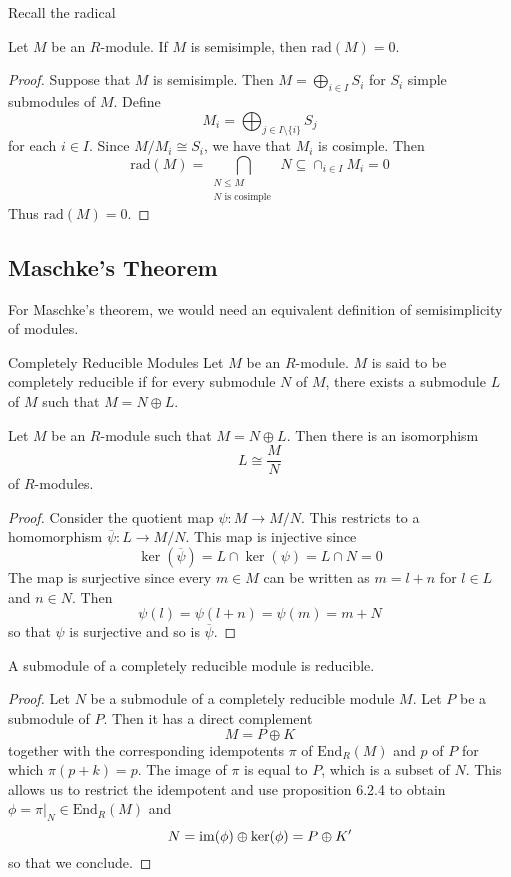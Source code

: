 \documentclass[a4paper]{article}
\begin{document}
Recall the radical 

\begin{lmm}{}{} Let $M$ be an $R$-module. If $M$ is semisimple, then $\text{rad}(M)=0$. \tcbline
\begin{proof}
Suppose that $M$ is semisimple. Then $M=\bigoplus_{i\in I}S_i$ for $S_i$ simple submodules of $M$. Define $$M_i=\bigoplus_{j\in I\setminus\{i\}}S_j$$ for each $i\in I$.  Since $M/M_i\cong S_i$, we have that $M_i$ is cosimple. Then $$\text{rad}(M)=\bigcap_{\substack{N\leq M\\N\text{ is cosimple }}}N\subseteq\cap_{i\in I}M_i=0$$ Thus $\text{rad}(M)=0$. 
\end{proof}
\end{lmm}

\subsection{Maschke's Theorem}
For Maschke's theorem, we would need an equivalent definition of semisimplicity of modules. 

\begin{defn}{Completely Reducible Modules}{} Let $M$ be an $R$-module. $M$ is said to be completely reducible if for every submodule $N$ of $M$, there exists a submodule $L$ of $M$ such that $M=N\oplus L$. 
\end{defn}

\begin{prp}{}{} Let $M$ be an $R$-module such that $M=N\oplus L$. Then there is an isomorphism $$L\cong\frac{M}{N}$$ of $R$-modules. \tcbline
\begin{proof}
Consider the quotient map $\psi:M\to M/N$. This restricts to a homomorphism $\overline{\psi}:L\to M/N$. This map is injective since $$\ker(\overline{\psi})=L\cap\ker(\psi)=L\cap N=0$$ The map is surjective since every $m\in M$ can be written as $m=l+n$ for $l\in L$ and $n\in N$. Then $$\psi(l)=\psi(l+n)=\psi(m)=m+N$$ so that $\psi$ is surjective and so is $\overline{\psi}$. 
\end{proof}
\end{prp}

\begin{lmm}{}{} A submodule of a completely reducible module is reducible. \tcbline
\begin{proof}
Let $N$ be a submodule of a completely reducible module $M$. Let $P$ be a submodule of $P$. Then it has a direct complement $$M=P\oplus K$$ together with the corresponding idempotents $\pi$ of $\text{End}_R(M)$ and $p$ of $P$ for which $\pi(p+k)=p$. The image of $\pi$ is equal to $P$, which is a subset of $N$. This allows us to restrict the idempotent and use proposition 6.2.4 to obtain $\phi=\pi|_N\in\text{End}_R(M)$ and $$N=\operatorname{im}(\phi)\oplus\ker(\phi)=P\oplus K'$$ so that we conclude. 
\end{proof}
\end{lmm}
\end{document}
